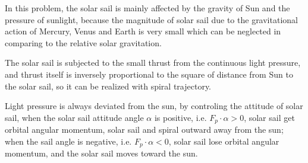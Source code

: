 \documentclass[../Paper.tex]{subfiles}
\begin{document}
In this problem, the solar sail is mainly affected by the gravity of Sun and the pressure of sunlight, because the magnitude of solar sail due to the gravitational action of Mercury, Venus and Earth is very small which can be neglected in comparing to the relative solar gravitation.

The solar sail is subjected to the small thrust from the continuous light pressure, and thrust itself is inversely proportional to the square of distance from Sun to the solar sail, so it can be realized with spiral trajectory.      

Light pressure is always deviated from the sun, by controling the attitude of solar sail, when the solar sail attitude angle $\alpha$ is positive, i.e. $F_p\cdot\alpha>0$, solar sail get orbital angular momentum, solar sail and spiral outward away from the sun; when the sail angle is negative, i.e. $F_p\cdot\alpha<0$, solar sail lose orbital angular momentum, and the solar sail moves toward the sun. 
\end{document}
